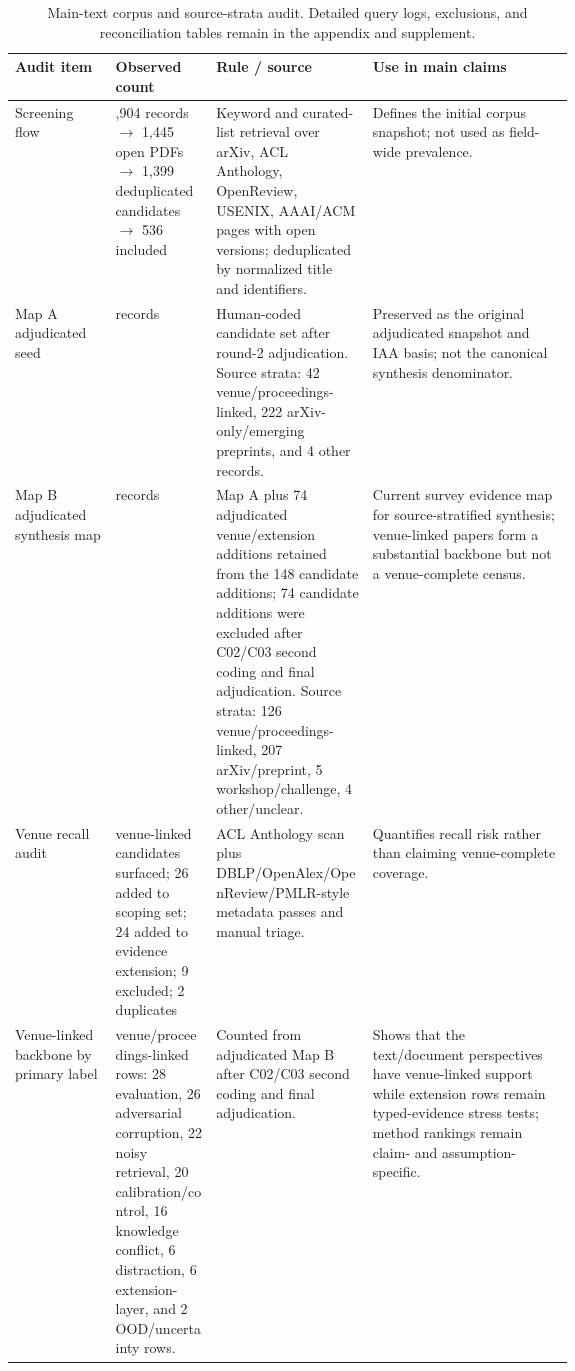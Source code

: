 \documentclass[11pt]{article}
\begin{document}

\begin{table}[t]
\centering
\scriptsize
\renewcommand{\arraystretch}{0.88}
\begin{tabularx}{\linewidth}{>{\raggedright\arraybackslash}p{0.18\linewidth}>{\raggedright\arraybackslash}p{0.18\linewidth}>{\raggedright\arraybackslash}p{0.29\linewidth}X}
\toprule
\textbf{Audit item} & \textbf{Observed count} & \textbf{Rule / source} & \textbf{Use in main claims} \\
\midrule
Screening flow & 1,904 records $\rightarrow$ 1,445 open PDFs $\rightarrow$ 1,399 deduplicated candidates $\rightarrow$ 536 included & Keyword and curated-list retrieval over arXiv, ACL Anthology, OpenReview, USENIX, AAAI/ACM pages with open versions; deduplicated by normalized title and identifiers. & Defines the initial corpus snapshot; not used as field-wide prevalence. \\
Map A adjudicated seed & 268 records & Human-coded candidate set after round-2 adjudication. Source strata: 42 venue/proceedings-linked, 222 arXiv-only/emerging preprints, and 4 other records. & Preserved as the original adjudicated snapshot and IAA basis; not the canonical synthesis denominator. \\
Map B adjudicated synthesis map & 342 records & Map A plus 74 adjudicated venue/extension additions retained from the 148 candidate additions; 74 candidate additions were excluded after C02/C03 second coding and final adjudication. Source strata: 126 venue/proceedings-linked, 207 arXiv/preprint, 5 workshop/challenge, 4 other/unclear. & Current survey evidence map for source-stratified synthesis; venue-linked papers form a substantial backbone but not a venue-complete census. \\
Venue recall audit & 51 venue-linked candidates surfaced; 26 added to scoping set; 24 added to evidence extension; 9 excluded; 2 duplicates & ACL Anthology scan plus DBLP/OpenAlex/OpenReview/PMLR-style metadata passes and manual triage. & Quantifies recall risk rather than claiming venue-complete coverage. \\
Venue-linked backbone by primary label & 126 venue/proceedings-linked rows: 28 evaluation, 26 adversarial corruption, 22 noisy retrieval, 20 calibration/control, 16 knowledge conflict, 6 distraction, 6 extension-layer, and 2 OOD/uncertainty rows. & Counted from adjudicated Map B after C02/C03 second coding and final adjudication. & Shows that the text/document perspectives have venue-linked support while extension rows remain typed-evidence stress tests; method rankings remain claim- and assumption-specific. \\
\bottomrule
\end{tabularx}
\caption{Main-text corpus and source-strata audit. Detailed query logs, exclusions, and reconciliation tables remain in the appendix and supplement.}
\label{tab:main-corpus-audit}
\end{table}
\end{document}
